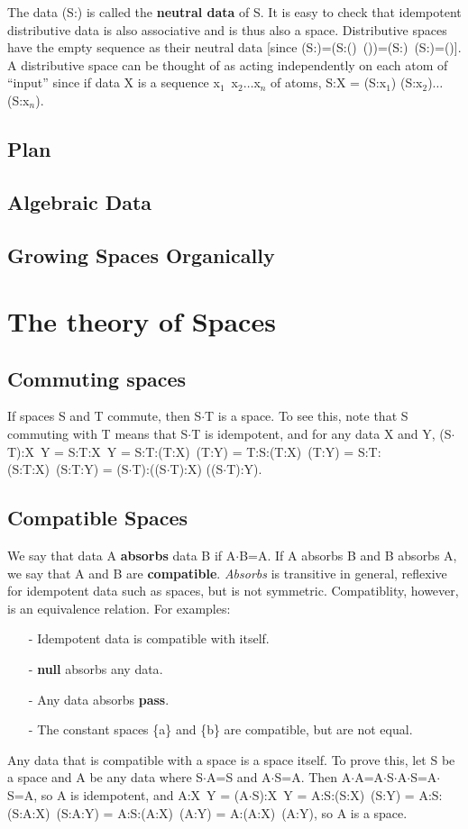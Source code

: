 \documentclass[11pt]{article}
\begin{document}
The data (S:) is called the {\bf neutral data} of S.  
It is easy to check that idempotent distributive data is also associative and is thus also a space. 
Distributive spaces have the empty sequence as their neutral data [since (S:)=(S:()\ ())=(S:)\ (S:)=()].  A distributive space can be thought of as acting independently on each atom of ``input'' since if data 
X is a sequence x$_1$\ x$_2\dots$x$_n$ of atoms, S:X = (S:x$_1$) (S:x$_2$)$\dots$(S:x$_n$).  

\subsection{Plan} 

\subsection{Algebraic Data} 

\subsection{Growing Spaces Organically} 

\section{The theory of Spaces}

\subsection{Commuting spaces}
If spaces S and T commute, then S$\cdot$T is a space.  To see this, note that S commuting with T means that S$\cdot$T is idempotent, and for any data X and Y, 
(S$\cdot$T):X\ Y = S:T:X\ Y = S:T:(T:X)\ (T:Y) = T:S:(T:X)\ (T:Y) = S:T:(S:T:X)\ (S:T:Y) = (S$\cdot$T):((S$\cdot$T):X) ((S$\cdot$T):Y).

\subsection{Compatible Spaces}

We say that data A {\bf absorbs} data B if A$\cdot$B=A.  If A absorbs B and B absorbs A, we say that A and B are {\bf compatible}.  {\it Absorbs} is transitive in general, reflexive for idempotent data such as spaces, but is not symmetric.  Compatiblity, however, is an equivalence relation.  For examples:
\begin{itemize}
\item[-]{Idempotent data is compatible with itself.}
\item[-]{{\bf null} absorbs any data}.
\item[-]{Any data absorbs {\bf pass}}.
\item[-]{The constant spaces \{a\} and \{b\} are compatible, but are not equal.}
\end{itemize}
Any data that is compatible with a space is a space itself.  To prove this, let S be a space and A be any data where S$\cdot$A=S and A$\cdot$S=A.
Then A$\cdot$A=A$\cdot$S$\cdot$A$\cdot$S=A$\cdot$S=A, so A is idempotent, and A:X\ Y = (A$\cdot$S):X\ Y = A:S:(S:X)\ (S:Y) = A:S:(S:A:X)\ (S:A:Y) = A:S:(A:X)\ (A:Y) = 
A:(A:X)\ (A:Y), so A is a space. 
\end{document}
